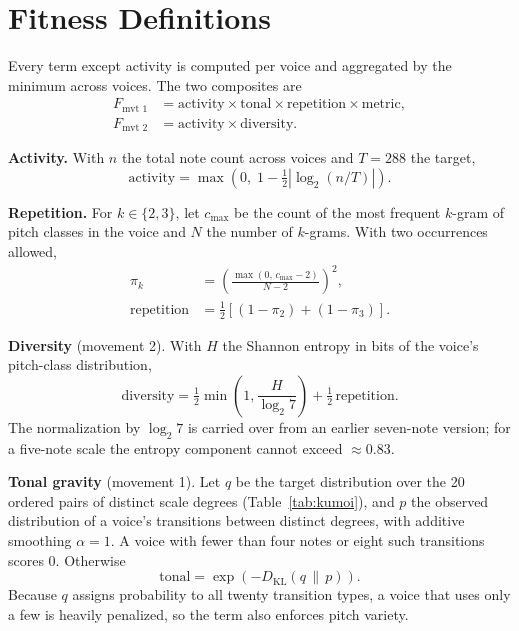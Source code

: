 \documentclass[conference]{IEEEtran}
\begin{document}
\section{Fitness Definitions}
\label{app:fitness}

Every term except activity is computed per voice and aggregated by the minimum across voices. The two composites are
\begin{align}
F_{\text{mvt 1}} &= \text{activity} \times \text{tonal} \times \text{repetition} \times \text{metric}, \\
F_{\text{mvt 2}} &= \text{activity} \times \text{diversity}.
\end{align}

\textbf{Activity.} With $n$ the total note count across voices and $T = 288$ the target,
\begin{equation}
\text{activity} = \max\!\left(0,\; 1 - \tfrac{1}{2}\left|\log_2 (n/T)\right|\right).
\end{equation}

\textbf{Repetition.} For $k \in \{2, 3\}$, let $c_{\max}$ be the count of the most frequent $k$-gram of pitch classes in the voice and $N$ the number of $k$-grams. With two occurrences allowed,
\begin{align}
\pi_k &= \left(\frac{\max(0,\, c_{\max} - 2)}{N - 2}\right)^{2}, \\
\text{repetition} &= \tfrac{1}{2}\left[(1 - \pi_2) + (1 - \pi_3)\right].
\end{align}

\textbf{Diversity} (movement 2). With $H$ the Shannon entropy in bits of the voice's pitch-class distribution,
\begin{equation}
\text{diversity} = \tfrac{1}{2}\min\!\left(1, \frac{H}{\log_2 7}\right) + \tfrac{1}{2}\,\text{repetition}.
\end{equation}
The normalization by $\log_2 7$ is carried over from an earlier seven-note version; for a five-note scale the entropy component cannot exceed $\approx 0.83$.

\textbf{Tonal gravity} (movement 1). Let $q$ be the target distribution over the 20 ordered pairs of distinct scale degrees (Table~\ref{tab:kumoi}), and $p$ the observed distribution of a voice's transitions between distinct degrees, with additive smoothing $\alpha = 1$. A voice with fewer than four notes or eight such transitions scores 0. Otherwise
\begin{equation}
\text{tonal} = \exp\!\left(-D_{\mathrm{KL}}(q \,\|\, p)\right).
\end{equation}
Because $q$ assigns probability to all twenty transition types, a voice that uses only a few is heavily penalized, so the term also enforces pitch variety.
\end{document}
